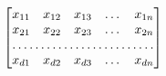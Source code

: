 \documentclass{article}
\begin{document}
\[
\begin{bmatrix}
  x_{11}       & x_{12} & x_{13} & \dots & x_{1n} \\
  x_{21}       & x_{22} & x_{23} & \dots & x_{2n} \\
  \hdotsfor{5}                                    \\
  x_{d1}       & x_{d2} & x_{d3} & \dots & x_{dn}
\end{bmatrix}
\]
\end{document}
